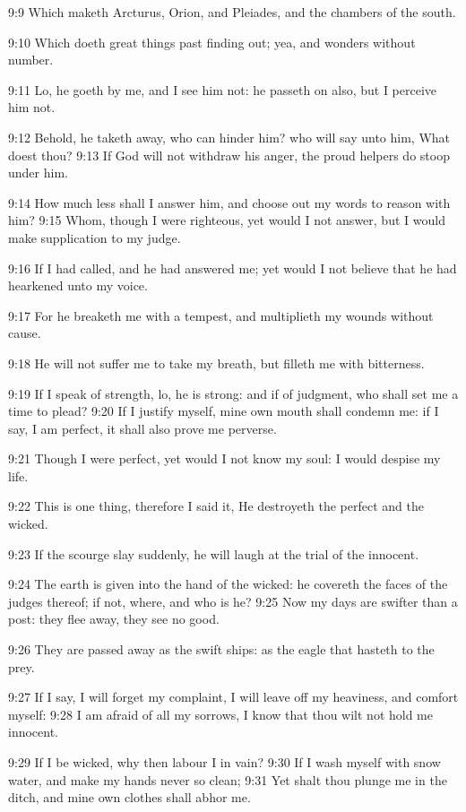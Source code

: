 9:9 Which maketh Arcturus, Orion, and Pleiades, and the chambers of
the south.

9:10 Which doeth great things past finding out; yea, and wonders
without number.

9:11 Lo, he goeth by me, and I see him not: he passeth on also, but I
perceive him not.

9:12 Behold, he taketh away, who can hinder him? who will say unto
him, What doest thou?  9:13 If God will not withdraw his anger, the
proud helpers do stoop under him.

9:14 How much less shall I answer him, and choose out my words to
reason with him?  9:15 Whom, though I were righteous, yet would I not
answer, but I would make supplication to my judge.

9:16 If I had called, and he had answered me; yet would I not believe
that he had hearkened unto my voice.

9:17 For he breaketh me with a tempest, and multiplieth my wounds
without cause.

9:18 He will not suffer me to take my breath, but filleth me with
bitterness.

9:19 If I speak of strength, lo, he is strong: and if of judgment, who
shall set me a time to plead?  9:20 If I justify myself, mine own
mouth shall condemn me: if I say, I am perfect, it shall also prove me
perverse.

9:21 Though I were perfect, yet would I not know my soul: I would
despise my life.

9:22 This is one thing, therefore I said it, He destroyeth the perfect
and the wicked.

9:23 If the scourge slay suddenly, he will laugh at the trial of the
innocent.

9:24 The earth is given into the hand of the wicked: he covereth the
faces of the judges thereof; if not, where, and who is he?  9:25 Now
my days are swifter than a post: they flee away, they see no good.

9:26 They are passed away as the swift ships: as the eagle that
hasteth to the prey.

9:27 If I say, I will forget my complaint, I will leave off my
heaviness, and comfort myself: 9:28 I am afraid of all my sorrows, I
know that thou wilt not hold me innocent.

9:29 If I be wicked, why then labour I in vain?  9:30 If I wash myself
with snow water, and make my hands never so clean; 9:31 Yet shalt thou
plunge me in the ditch, and mine own clothes shall abhor me.

